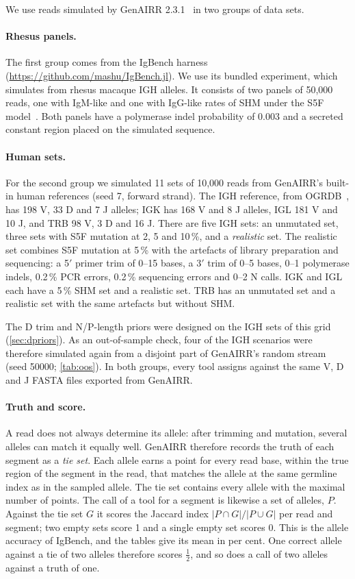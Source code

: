 \documentclass[11pt,a4paper]{article}
\begin{document}
We use reads simulated by GenAIRR
2.3.1~\cite{konstantinovsky2024genairr} in two groups of data sets.

\paragraph{Rhesus panels.} The first group comes from the IgBench harness
(\url{https://github.com/mashu/IgBench.jl}). We use its bundled
 experiment, which simulates from rhesus macaque IGH
alleles. It consists of two panels of 50,000 reads, one with IgM-like and
one with IgG-like rates of SHM under the S5F model~\cite{yaari2013s5f}. Both
panels have a polymerase indel probability of 0.003 and a secreted constant
region placed on the simulated sequence.

\paragraph{Human sets.} For the second group we simulated 11 sets of 10,000
reads from GenAIRR's built-in human references (seed 7, forward strand). The
IGH reference, from OGRDB~\cite{lees2020ogrdb}, has 198 V, 33 D and 7 J
alleles; IGK has 168 V and 8 J alleles, IGL 181 V and 10 J, and TRB 98 V, 3
D and 16 J. There are five IGH sets: an unmutated set, three sets with S5F
mutation at 2, 5 and 10\,\%, and a \emph{realistic} set. The realistic set
combines S5F mutation at 5\,\% with the artefacts of library preparation and
sequencing: a 5$'$ primer trim of 0--15 bases, a 3$'$ trim of 0--5 bases,
0--1 polymerase indels, 0.2\,\% PCR errors, 0.2\,\% sequencing errors and
0--2 N calls. IGK and IGL each have a 5\,\% SHM set and a realistic set. TRB
has an unmutated set and a realistic set with the same artefacts but without
SHM.

The D trim and N/P-length priors were designed on the IGH sets of this grid
(\cref{sec:dpriors}). As an out-of-sample check, four of the IGH scenarios
were therefore simulated again from a disjoint part of GenAIRR's random
stream (seed 50000; \cref{tab:oos}). In both groups, every tool assigns
against the same V, D and J FASTA files exported from GenAIRR.

\paragraph{Truth and score.} A read does not always determine its allele:
after trimming and mutation, several alleles can match it equally well.
GenAIRR therefore records the truth of each segment as a \emph{tie set}.
Each allele earns a point for every read base, within the true region of the
segment in the read, that matches the allele at the same germline index as
in the sampled allele. The tie set contains every allele with the maximal
number of points. The call of a tool for a segment is likewise a set of
alleles, $P$. Against the tie set $G$ it scores the Jaccard index
$|P\cap G|/|P\cup G|$ per read and segment; two empty sets score 1 and a
single empty set scores 0. This is the allele accuracy of IgBench, and the
tables give its mean in per cent. One correct allele against a tie of two
alleles therefore scores $\tfrac12$, and so does a call of two alleles
against a truth of one.
\end{document}
